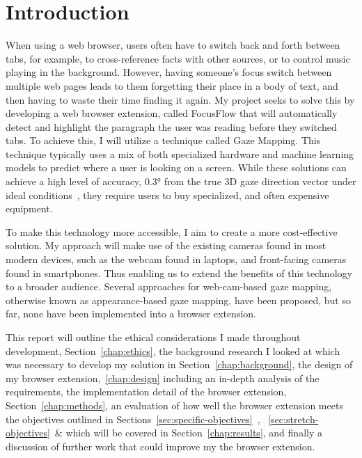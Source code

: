 \documentclass{report}
\begin{document}
\tableofcontents

\chapter{Introduction}
\label{chap:intro}
\noindent
When using a web browser, users often have to switch back and forth between tabs, for example, to cross-reference facts with other sources, or to control music playing in the background. However, having someone's focus switch between multiple web pages leads to them forgetting their place in a body of text, and then having to waste their time finding it again. My project seeks to solve this by developing a web browser extension, called FocusFlow that will automatically detect and highlight the paragraph the user was reading before they switched tabs. To achieve this, I will utilize a technique called Gaze Mapping. This technique typically uses a mix of both specialized hardware and machine learning models to predict where a user is looking on a screen. While these solutions can achieve a high level of accuracy, \(\ang{0.3}\) from the true 3D gaze direction vector under ideal conditions~\cite{tobiiprofusion}, they require users to buy specialized, and often expensive equipment.

To make this technology more accessible, I aim to create a more cost-effective solution. My approach will make use of the existing cameras found in most modern devices, such as the webcam found in laptops, and front-facing cameras found in smartphones. Thus enabling us to extend the benefits of this technology to a broader audience. Several approaches for web-cam-based gaze mapping, otherwise known as appearance-based gaze mapping, have been proposed, but so far, none have been implemented into a browser extension. 

This report will outline the ethical considerations I made throughout development, Section~\ref{chap:ethics}, the background research I looked at which was necessary to develop my solution in Section~\ref{chap:background}, the design of my browser extension,~\autoref{chap:design} including an in-depth analysis of the requirements, the implementation detail of the browser extension, Section~\ref{chap:methods}, an evaluation of how well the browser extension meets the objectives outlined in Sections~\ref{sec:specific-objectives}~, ~\ref{sec:stretch-objectives}~\& which will be covered in Section~\ref{chap:results}, and finally a discussion of further work that could improve my the browser extension. 
\end{document}
